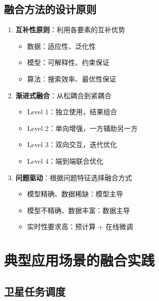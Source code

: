 \documentclass[12pt,a4paper]{ctexart}
\begin{document}
\subsection{融合方法的设计原则}

\begin{keypoint}[数据-模型-算法融合的设计原则]
\begin{enumerate}
    \item \textbf{互补性原则}：利用各要素的互补优势
    \begin{itemize}
        \item 数据：适应性、泛化性
        \item 模型：可解释性、约束保证
        \item 算法：搜索效率、最优性保证
    \end{itemize}

    \item \textbf{渐进式融合}：从松耦合到紧耦合
    \begin{itemize}
        \item Level 1：独立使用，结果组合
        \item Level 2：单向增强，一方辅助另一方
        \item Level 3：双向交互，迭代优化
        \item Level 4：端到端联合优化
    \end{itemize}

    \item \textbf{问题驱动}：根据问题特征选择融合方式
    \begin{itemize}
        \item 模型精确、数据稀缺：模型主导
        \item 模型不精确、数据丰富：数据主导
        \item 实时性要求高：预计算 + 在线微调
    \end{itemize}
\end{enumerate}
\end{keypoint}

\section{典型应用场景的融合实践}

\subsection{卫星任务调度}
\end{document}
